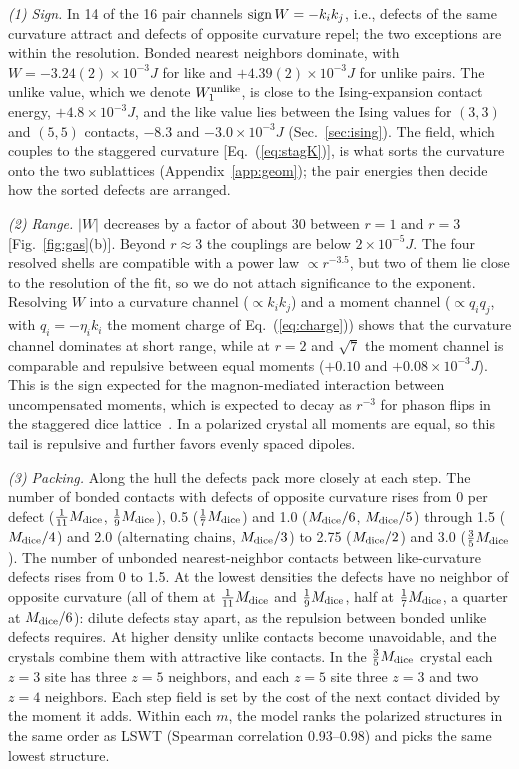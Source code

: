 \documentclass[prb,twocolumn,amsmath,amssymb,floatfix]{revtex4-2}
\newcommand{\Md}{M_{\rm dice}}
\begin{document}
\emph{(1) Sign.} In 14 of the 16 pair channels ${\rm sign}\,W=-k_ik_j$, i.e., defects of the same curvature attract and defects of opposite curvature repel; the two exceptions are within the resolution. Bonded nearest neighbors dominate, with $W=-3.24(2)\times10^{-3}J$ for like and $+4.39(2)\times10^{-3}J$ for unlike pairs. The unlike value, which we denote $W_1^{\rm unlike}$, is close to the Ising-expansion contact energy, $+4.8\times10^{-3}J$, and the like value lies between the Ising values for $(3,3)$ and $(5,5)$ contacts, $-8.3$ and $-3.0\times10^{-3}J$ (Sec.~\ref{sec:ising}). The field, which couples to the staggered curvature [Eq.~(\ref{eq:stagK})], is what sorts the curvature onto the two sublattices (Appendix~\ref{app:geom}); the pair energies then decide how the sorted defects are arranged.

\emph{(2) Range.} $|W|$ decreases by a factor of about 30 between $r=1$ and $r=3$ [Fig.~\ref{fig:gas}(b)]. Beyond $r\approx3$ the couplings are below $2\times10^{-5}J$. The four resolved shells are compatible with a power law $\propto r^{-3.5}$, but two of them lie close to the resolution of the fit, so we do not attach significance to the exponent. Resolving $W$ into a curvature channel ($\propto k_ik_j$) and a moment channel ($\propto q_iq_j$, with $q_i=-\eta_ik_i$ the moment charge of Eq.~(\ref{eq:charge})) shows that the curvature channel dominates at short range, while at $r=2$ and $\sqrt7$ the moment channel is comparable and repulsive between equal moments ($+0.10$ and $+0.08\times10^{-3}J$). This is the sign expected for the magnon-mediated interaction between uncompensated moments, which is expected to decay as $r^{-3}$ for phason flips in the staggered dice lattice~\cite{Jagannathan2012}. In a polarized crystal all moments are equal, so this tail is repulsive and further favors evenly spaced dipoles.

\emph{(3) Packing.} Along the hull the defects pack more closely at each step. The number of bonded contacts with defects of opposite curvature rises from 0 per defect ($\frac1{11}\Md$, $\frac19\Md$), 0.5 ($\frac17\Md$) and 1.0 ($\Md/6$, $\Md/5$) through 1.5 ($\Md/4$) and 2.0 (alternating chains, $\Md/3$) to 2.75 ($\Md/2$) and 3.0 ($\frac35\Md$). The number of unbonded nearest-neighbor contacts between like-curvature defects rises from 0 to 1.5. At the lowest densities the defects have no neighbor of opposite curvature (all of them at $\frac1{11}\Md$ and $\frac19\Md$, half at $\frac17\Md$, a quarter at $\Md/6$): dilute defects stay apart, as the repulsion between bonded unlike defects requires. At higher density unlike contacts become unavoidable, and the crystals combine them with attractive like contacts. In the $\frac35\Md$ crystal each $z=3$ site has three $z=5$ neighbors, and each $z=5$ site three $z=3$ and two $z=4$ neighbors. Each step field is set by the cost of the next contact divided by the moment it adds. Within each $m$, the model ranks the polarized structures in the same order as LSWT (Spearman correlation 0.93--0.98) and picks the same lowest structure.
\end{document}
